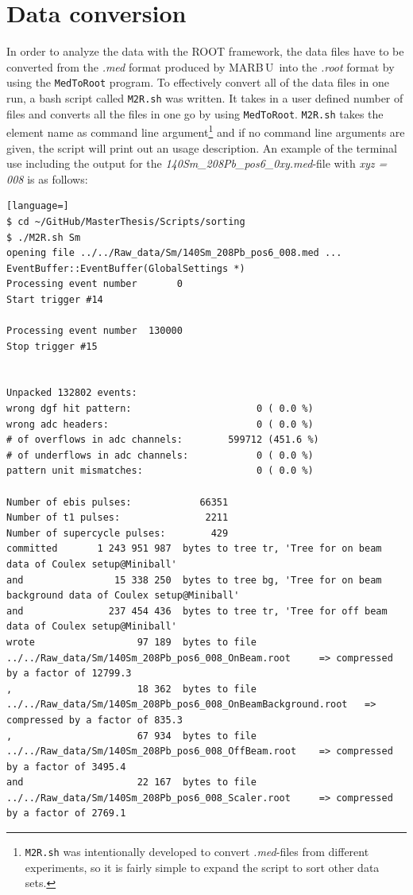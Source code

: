 \documentclass[twoside,english]{uiofysmaster/uiofysmaster}
\newcommand{\MBOU}{MAR\belowbaseline[-2pt]{a}B\stackinset{l}{3pt}{b}{-3pt}{O}{O}\,U}
\begin{document}
\section{Data conversion}\label{sec:data_conversion}
In order to analyze the data with the ROOT framework, the data files have to be converted from the 
\textit{.med} format produced by \MBOU\ into the \textit{.root} format by using the \texttt{MedToRoot} program. 
To effectively convert all of the data files in one run, a bash script called \texttt{M2R.sh} was written.
It takes in a user defined number of files and converts all the files in one go by using \texttt{MedToRoot}.
\texttt{M2R.sh} takes the element name as command line argument\footnote{\texttt{M2R.sh} was intentionally developed to convert \textit{.med}-files from different experiments, so it is fairly simple to expand the script to sort other data sets.} and if no command line arguments are given, the script will print out an usage description.
An example of the terminal use including the output for the \textit{140Sm\_208Pb\_pos6\_0xy.med}-file with \textit{xyz = 008} is as follows: 

\begin{lstlisting}[language=]
$ cd ~/GitHub/MasterThesis/Scripts/sorting
$ ./M2R.sh Sm
opening file ../../Raw_data/Sm/140Sm_208Pb_pos6_008.med ...
EventBuffer::EventBuffer(GlobalSettings *)
Processing event number       0
Start trigger #14

Processing event number  130000
Stop trigger #15


Unpacked 132802 events:
wrong dgf hit pattern:                      0 ( 0.0 %)
wrong adc headers:                          0 ( 0.0 %)
# of overflows in adc channels:        599712 (451.6 %)
# of underflows in adc channels:            0 ( 0.0 %)
pattern unit mismatches:                    0 ( 0.0 %)

Number of ebis pulses:            66351
Number of t1 pulses:               2211
Number of supercycle pulses:        429
committed       1 243 951 987  bytes to tree tr, 'Tree for on beam data of Coulex setup@Miniball'
and                15 338 250  bytes to tree bg, 'Tree for on beam background data of Coulex setup@Miniball'
and               237 454 436  bytes to tree tr, 'Tree for off beam data of Coulex setup@Miniball'
wrote                  97 189  bytes to file ../../Raw_data/Sm/140Sm_208Pb_pos6_008_OnBeam.root 	=> compressed by a factor of 12799.3
,                      18 362  bytes to file ../../Raw_data/Sm/140Sm_208Pb_pos6_008_OnBeamBackground.root 	=> compressed by a factor of 835.3
,                      67 934  bytes to file ../../Raw_data/Sm/140Sm_208Pb_pos6_008_OffBeam.root 	=> compressed by a factor of 3495.4
and                    22 167  bytes to file ../../Raw_data/Sm/140Sm_208Pb_pos6_008_Scaler.root 	=> compressed by a factor of 2769.1
\end{lstlisting}
\end{document}
